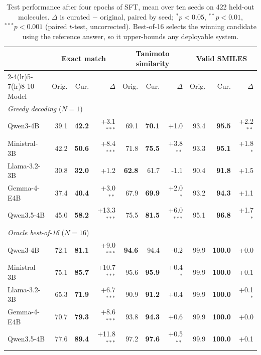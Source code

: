 \begin{table}[t]
\centering
\small
\begin{tabular}{lrrrrrrrrr}
\toprule
& \multicolumn{3}{c}{Exact match} & \multicolumn{3}{c}{Tanimoto similarity} & \multicolumn{3}{c}{Valid SMILES} \\
\cmidrule(lr){2-4}\cmidrule(lr){5-7}\cmidrule(lr){8-10}
Model & Orig. & Cur. & $\Delta$ & Orig. & Cur. & $\Delta$ & Orig. & Cur. & $\Delta$ \\
\midrule
\multicolumn{10}{l}{\textit{Greedy decoding} ($N=1$)} \\
Qwen3-4B & 39.1 & \textbf{42.2} & +3.1$^{***}$ & 69.1 & \textbf{70.1} & +1.0 & 93.4 & \textbf{95.5} & +2.2$^{**}$ \\
Ministral-3B & 42.2 & \textbf{50.6} & +8.4$^{***}$ & 71.8 & \textbf{75.5} & +3.8$^{**}$ & 93.3 & \textbf{95.1} & +1.8$^{*}$ \\
Llama-3.2-3B & 30.8 & \textbf{32.0} & +1.2 & \textbf{62.8} & 61.7 & -1.1 & 90.4 & \textbf{91.8} & +1.5 \\
Gemma-4-E4B & 37.4 & \textbf{40.4} & +3.0$^{**}$ & 67.9 & \textbf{69.9} & +2.0$^{*}$ & 93.2 & \textbf{94.3} & +1.1 \\
Qwen3.5-4B & 45.0 & \textbf{58.2} & +13.3$^{***}$ & 75.5 & \textbf{81.5} & +6.0$^{***}$ & 95.1 & \textbf{96.8} & +1.7$^{*}$ \\
\midrule
\multicolumn{10}{l}{\textit{Oracle best-of-16} ($N=16$)} \\
Qwen3-4B & 72.1 & \textbf{81.1} & +9.0$^{***}$ & \textbf{94.6} & 94.4 & -0.2 & 99.9 & \textbf{100.0} & +0.0 \\
Ministral-3B & 75.1 & \textbf{85.7} & +10.7$^{***}$ & 95.6 & \textbf{95.9} & +0.4$^{*}$ & 99.9 & \textbf{100.0} & +0.1 \\
Llama-3.2-3B & 65.3 & \textbf{71.9} & +6.7$^{***}$ & 90.9 & \textbf{91.2} & +0.4 & 99.9 & \textbf{100.0} & +0.1$^{*}$ \\
Gemma-4-E4B & 70.7 & \textbf{79.3} & +8.6$^{***}$ & 93.8 & \textbf{94.3} & +0.6 & 99.9 & \textbf{100.0} & +0.0 \\
Qwen3.5-4B & 77.6 & \textbf{89.4} & +11.8$^{***}$ & 97.2 & \textbf{97.6} & +0.5$^{**}$ & 99.9 & \textbf{100.0} & +0.1 \\
\bottomrule
\end{tabular}
\caption{Test performance after four epochs of SFT, mean over ten seeds on 422 held-out molecules. $\Delta$ is curated $-$ original, paired by seed; $^{*}p<0.05$, $^{**}p<0.01$, $^{***}p<0.001$ (paired $t$-test, uncorrected). Best-of-16 selects the winning candidate using the reference answer, so it upper-bounds any deployable system.}
\label{tab:main}
\end{table}
